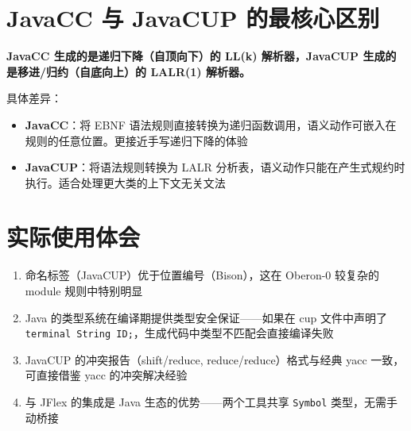 \documentclass[12pt,a4paper,fontset=none]{ctexart}
\begin{document}
\section{JavaCC 与 JavaCUP 的最核心区别}

\textbf{JavaCC 生成的是递归下降（自顶向下）的 LL(k) 解析器，JavaCUP 生成的是移进/归约（自底向上）的 LALR(1) 解析器。}

具体差异：
\begin{itemize}
  \item \textbf{JavaCC}：将 EBNF 语法规则直接转换为递归函数调用，语义动作可嵌入在规则的任意位置。更接近手写递归下降的体验
  \item \textbf{JavaCUP}：将语法规则转换为 LALR 分析表，语义动作只能在产生式规约时执行。适合处理更大类的上下文无关文法
\end{itemize}

\section{实际使用体会}

\begin{enumerate}
  \item 命名标签（JavaCUP）优于位置编号（Bison），这在 Oberon-0 较复杂的 module 规则中特别明显
  \item Java 的类型系统在编译期提供类型安全保证——如果在 cup 文件中声明了 \texttt{terminal String ID;}，生成代码中类型不匹配会直接编译失败
  \item JavaCUP 的冲突报告（shift/reduce, reduce/reduce）格式与经典 yacc 一致，可直接借鉴 yacc 的冲突解决经验
  \item 与 JFlex 的集成是 Java 生态的优势——两个工具共享 \texttt{Symbol} 类型，无需手动桥接
\end{enumerate}
\end{document}
